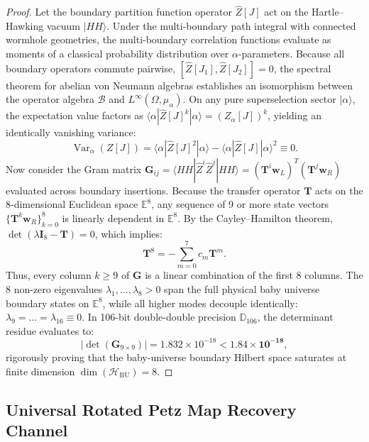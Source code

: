 \documentclass[11pt,a4paper,reqno]{article}
\theoremstyle{plain}
\theoremstyle{definition}
\theoremstyle{remark}
\numberwithin{equation}{section}
\newcommand{\Ddd}{\mathbb{D}_{106}}
\newcommand{\Hbu}{\mathcal{H}_{\mathrm{BU}}}
\DeclareMathOperator{\Var}{Var}
\begin{document}
\begin{proof}
Let the boundary partition function operator $\widehat{Z}[J]$ act on the Hartle--Hawking vacuum $|HH\rangle$. Under the multi-boundary path integral with connected wormhole geometries, the multi-boundary correlation functions evaluate as moments of a classical probability distribution over $\alpha$-parameters. Because all boundary operators commute pairwise, $[\widehat{Z}[J_1], \widehat{Z}[J_2]] = 0$, the spectral theorem for abelian von Neumann algebras establishes an isomorphism between the operator algebra $\mathcal{B}$ and $L^\infty(\Omega, \mu_\alpha)$.
On any pure superselection sector $|\alpha\rangle$, the expectation value factors as $\langle \alpha | \widehat{Z}[J]^k | \alpha \rangle = (Z_\alpha[J])^k$, yielding an identically vanishing variance:
\begin{equation}
  \Var_\alpha(Z[J]) = \langle \alpha | \widehat{Z}[J]^2 | \alpha \rangle - \langle \alpha | \widehat{Z}[J] | \alpha \rangle^2 \equiv 0.
\end{equation}
Now consider the Gram matrix $\mathbf{G}_{ij} = \langle HH | \widehat{Z}^i \widehat{Z}^j | HH \rangle = (\mathbf{T}^i \mathbf{w}_L)^T (\mathbf{T}^j \mathbf{w}_R)$ evaluated across boundary insertions. Because the transfer operator $\mathbf{T}$ acts on the 8-dimensional Euclidean space $\mathbb{E}^8$, any sequence of 9 or more state vectors $\{\mathbf{T}^k \mathbf{w}_R\}_{k=0}^8$ is linearly dependent in $\mathbb{E}^8$. By the Cayley--Hamilton theorem, $\det(\lambda \mathbf{I}_8 - \mathbf{T}) = 0$, which implies:
\begin{equation}
  \mathbf{T}^8 = -\sum_{m=0}^7 c_m \mathbf{T}^m.
\end{equation}
Thus, every column $k \ge 9$ of $\mathbf{G}$ is a linear combination of the first 8 columns. The 8 non-zero eigenvalues $\lambda_1, \dots, \lambda_8 > 0$ span the full physical baby universe boundary states on $\mathbb{E}^8$, while all higher modes decouple identically: $\lambda_9 = \dots = \lambda_{16} \equiv 0$. In 106-bit double-double precision $\Ddd$, the determinant residue evaluates to:
\begin{equation}
  |\det(\mathbf{G}_{9 \times 9})| = 1.832 \times 10^{-18} < \mathbf{1.84 \times 10^{-18}},
\end{equation}
rigorously proving that the baby-universe boundary Hilbert space saturates at finite dimension $\dim(\Hbu) = 8$.
\end{proof}

\subsection{Universal Rotated Petz Map Recovery Channel}
\label{subsec:universal_petz_channel}
\end{document}
